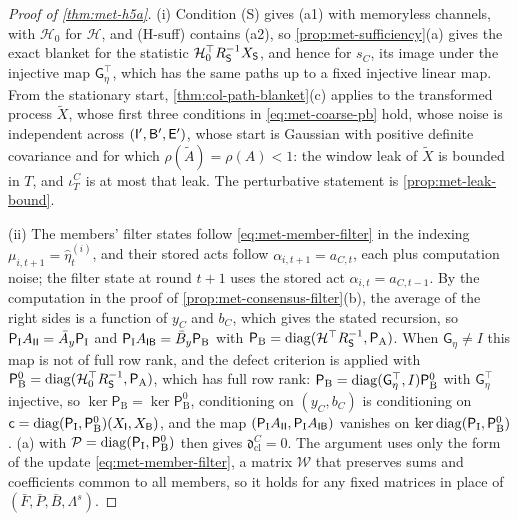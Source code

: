 \begin{proof}[Proof of \cref{thm:met-h5a}]
(i) Condition (S) gives (a1) with memoryless channels, with $\mathcal H_0$ for $\mathcal H$, and (H-suff) contains (a2), so \cref{prop:met-sufficiency}(a) gives the exact blanket for the statistic $\mathcal H_0^\top R_{\mathsf{S}}^{-1}X_{\mathsf{S}}$, and hence for $s_C$, its image under the injective map $\mathsf G_\eta^\top$, which has the same paths up to a fixed injective linear map. From the stationary start, \cref{thm:col-path-blanket}(c) applies to the transformed process $\tilde X$, whose first three conditions in \eqref{eq:met-coarse-pb} hold, whose noise is independent across $(\mathsf{I}',\mathsf{B}',\mathsf{E}')$, whose start is Gaussian with positive definite covariance and for which $\rho(\tilde A)=\rho(A)<1$: the window leak of $\tilde X$ is bounded in $T$, and $\iota^C_T$ is at most that leak. The perturbative statement is \cref{prop:met-leak-bound}.

(ii) The members' filter states follow \eqref{eq:met-member-filter} in the indexing $\mu_{i,t+1}=\hat\eta^{(i)}_t$, and their stored acts follow $\alpha_{i,t+1}=a_{C,t}$, each plus computation noise; the filter state at round $t+1$ uses the stored act $\alpha_{i,t}=a_{C,t-1}$. By the computation in the proof of \cref{prop:met-consensus-filter}(b), the average of the right sides is a function of $y_C$ and $b_C$, which gives the stated recursion, so $\mathsf P_{\mathrm I}A_{\mathsf{I}\mathsf{I}}=\bar A_y\mathsf P_{\mathrm I}$ and $\mathsf P_{\mathrm I}A_{\mathsf{I}\mathsf{B}}=\bar B_y\mathsf P_{\mathrm B}$ with $\mathsf P_{\mathrm B}=\operatorname{diag}(\mathcal H^\top R_{\mathsf{S}}^{-1},\mathsf P_{\mathrm A})$. When $\mathsf G_\eta\ne I$ this map is not of full row rank, and the defect criterion is applied with $\mathsf P^0_{\mathrm B}=\operatorname{diag}(\mathcal H_0^\top R_{\mathsf{S}}^{-1},\mathsf P_{\mathrm A})$, which has full row rank: $\mathsf P_{\mathrm B}=\operatorname{diag}(\mathsf G_\eta^\top,I)\mathsf P^0_{\mathrm B}$ with $\mathsf G_\eta^\top$ injective, so $\ker\mathsf P_{\mathrm B}=\ker\mathsf P^0_{\mathrm B}$, conditioning on $(y_C,b_C)$ is conditioning on $\mathsf c=\operatorname{diag}(\mathsf P_{\mathrm I},\mathsf P^0_{\mathrm B})(X_{\mathsf{I}},X_{\mathsf{B}})$, and the map $(\mathsf P_{\mathrm I}A_{\mathsf{I}\mathsf{I}},\mathsf P_{\mathrm I}A_{\mathsf{I}\mathsf{B}})$ vanishes on $\ker\operatorname{diag}(\mathsf P_{\mathrm I},\mathsf P^0_{\mathrm B})$. (a) with $\mathcal P=\operatorname{diag}(\mathsf P_{\mathrm I},\mathsf P^0_{\mathrm B})$ then gives $\mathfrak d^C_{\mathrm{cl}}=0$. The argument uses only the form of the update \eqref{eq:met-member-filter}, a matrix $\mathcal W$ that preserves sums and coefficients common to all members, so it holds for any fixed matrices in place of $(\bar F,\bar P,\bar B,\Lambda^s)$.


\end{proof}
